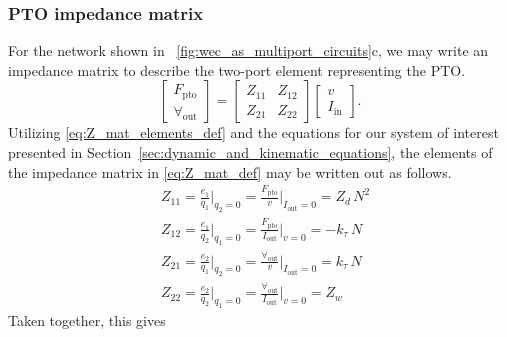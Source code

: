 \documentclass[twocolumn]{autart}
\begin{document}
\subsubsection{PTO impedance matrix}\label{sec:pto_impedance_matrix}

For the network shown in \figurename~\ref{fig:wec_as_multiport_circuits}c, we may write an impedance matrix to describe the two-port element representing the PTO.
%
\begin{equation}
        \label{eq:Z_mat_def}
        \begin{bmatrix} 
                F_{\textrm{pto}} \\
                \forall_{\textrm{out}} 
        \end{bmatrix} 
        = 
        \begin{bmatrix} 
                Z_{11} & Z_{12} \\ 
                Z_{21} & Z_{22} 
        \end{bmatrix} 
        \begin{bmatrix} 
                v \\
                I_{\textrm{in}} 
        \end{bmatrix}.
\end{equation}
%
Utilizing \eqref{eq:Z_mat_elements_def} and the equations for our system of interest presented in Section~\ref{sec:dynamic_and_kinematic_equations}, the elements of the impedance matrix in \eqref{eq:Z_mat_def} may be written out as follows.
%
\begin{subequations}
        \begin{align}
                &Z_{11} = \frac{e_1}{q_1} \bigg \vert_{q_2=0} 
                = \frac{F_{\textrm{pto}}}{v} \bigg \vert_{I_{\textrm{out}}=0} = Z_d \, N^2 \\[0.5em]
                &Z_{12} = \frac{e_1}{q_2} \bigg \vert_{q_1=0} 
                = \frac{F_{\textrm{pto}}}{I_{\textrm{out}}} \bigg \vert_{v=0} = -k_\tau \, N \\[0.5em]
                &Z_{21} = \frac{e_2}{q_1} \bigg \vert_{q_2=0} 
                = \frac{\forall_{\textrm{out}}}{v} \bigg \vert_{I_{\textrm{out}}=0} = k_\tau \, N \\[0.5em]
                &Z_{22} = \frac{e_2}{q_2} \bigg \vert_{q_1=0} 
                = \frac{\forall_{\textrm{out}}}{I_{\textrm{out}}} \bigg \vert_{v=0} = Z_w 
        \end{align}
\end{subequations}
%
Taken together, this gives 
\end{document}
